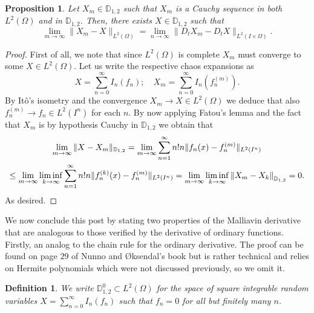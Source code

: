 \documentclass[12pt]{article}
\newtheorem{proposition}{Proposition}
\newtheorem{definition}{Definition}
\begin{document}
\begin{proposition}
	Let $X_m \in \mathbb{D}_{1,2}$ such that $X_m$ is a Cauchy sequence in both  $L^2(\Omega)$ and in $\mathbb{D}_{1,2}$. Then, there exists  $X \in \mathbb{D}_{1,2}$ such that
	\begin{equation*}
		\lim_{m \to \infty}\|X_m-X\|_{L^2(\Omega)}=\lim_{n \to \infty}\|D_tX_m-D_tX\|_{L^2(I\times\Omega)}.
	\end{equation*}
\end{proposition}
\begin{proof}
	First of all, we note that since $L^2(\Omega)$ is complete $X_m$ must converge to some  $X\in L^2(\Omega)$. Let us write the respective chaos expansions as
	\begin{equation*}
		X=\sum_{n=0}^{\infty} I_n(f_n);\quad X_m=\sum_{n=0}^{\infty} I_n(f_n^{(m)}).
	\end{equation*}
	By Itô's isometry and the convergence $X_m\to X\in L^2(\Omega)$ we deduce that also $f^{(m)}_n\to f_n\in L^2(I^n)$ for each $n$.    By now applying Fatou's lemma and the fact that $X_m$ is by hypothesis Cauchy in  $\mathbb{D}_{1,2}$ we obtain that
	\begin{multline*}
		\lim_{m \to \infty}\|X-X_m\|_{\mathbb{D}_{1,2}}=\lim_{m \to \infty}\sum_{n=1}^{\infty} n!n \|f_n(x)-f_n^{(m)}\|_{L^2(I^n)}\\\leq \lim_{m \to \infty}\liminf_{k \to \infty}\sum_{n=1}^{\infty} n!n \|f_n^{(k)}(x)-f_n^{(m)}\|_{L^2(I^n)}=\lim_{m \to \infty}\liminf_{k \to \infty}\norm{X_m-X_k}_{\mathbb{D}_{1,2}}=0.
	\end{multline*}
	As desired.
\end{proof}
We now conclude this post by stating two  properties of the Malliavin derivative that are analogous to those verified by the derivative of ordinary functions. Firstly, an analog to the chain rule for the ordinary derivative. The proof can be found on page $29$ of Nunno and Øksendal's book \cite{nunno2008malliavin} but is rather technical and relies on Hermite polynomials which were not discussed previously, so we omit it.
\begin{definition}
	We write $\mathbb{D}_{1,2}^0\subset L^2(\Omega)$ for the space of square integrable random variables $X=\sum_{n=0}^{\infty} I_n(f_n)$ such that $f_n=0$ for all but finitely many  $n$.
\end{definition}
\end{document}
